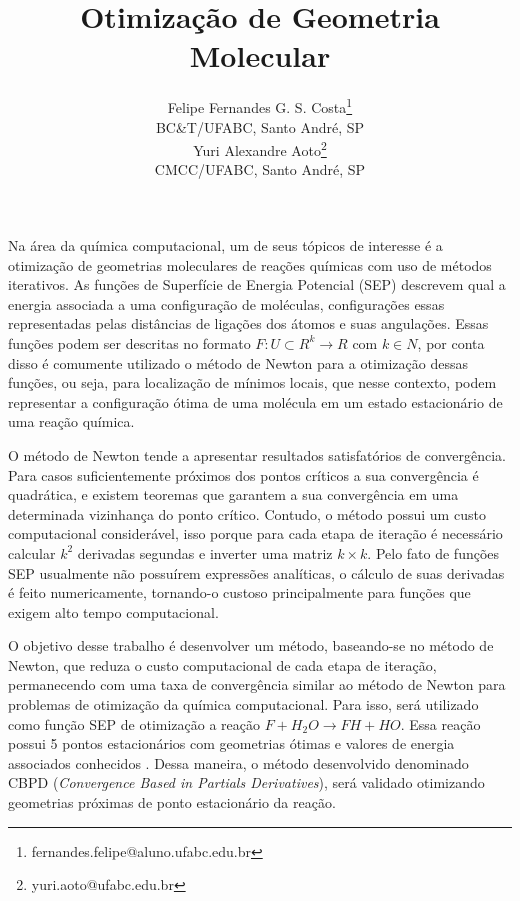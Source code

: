 \documentclass{pssbmac}
\begin{document}

\title{Otimização de Geometria Molecular}

\author{
    {\large Felipe Fernandes G. S. Costa}\thanks{fernandes.felipe@aluno.ufabc.edu.br} \\
    {\small BC\&T/UFABC, Santo André, SP} \\
    {\large Yuri Alexandre Aoto}\thanks{yuri.aoto@ufabc.edu.br} \\
    {\small CMCC/UFABC, Santo André, SP} \\
}
\criartitulo



Na área da química computacional, um de seus tópicos de interesse é a otimização de geometrias moleculares de reações químicas com uso de métodos iterativos. As funções de Superfície de Energia Potencial (SEP) descrevem qual a energia associada a uma configuração de moléculas, configurações essas representadas pelas distâncias de ligações dos átomos e suas angulações. Essas funções podem ser descritas no formato $F: U \subset R^k\to R$ com $k \in N$, por conta disso é comumente utilizado o método de Newton para a otimização dessas funções, ou seja, para localização de mínimos locais, que nesse contexto, podem representar a configuração ótima de uma molécula em um estado estacionário de uma reação química.

O método de Newton tende a apresentar resultados satisfatórios de convergência. Para casos suficientemente próximos dos pontos críticos a sua convergência é quadrática, e existem teoremas \cite{calculo_numerico_aplicado} que garantem a sua convergência em uma determinada vizinhança do ponto crítico. Contudo, o método possui um custo computacional considerável, isso porque para cada etapa de iteração é necessário calcular $k^2$ derivadas segundas e inverter uma matriz $k \times k$. Pelo fato de funções SEP usualmente não possuírem expressões analíticas, o cálculo de suas derivadas é feito numericamente, tornando-o custoso principalmente para funções que exigem alto tempo computacional.

O objetivo desse trabalho é desenvolver um método, baseando-se no método de Newton, que reduza o custo computacional de cada etapa de iteração, permanecendo com uma taxa de convergência similar ao método de Newton para problemas de otimização da química computacional. Para isso, será utilizado como função SEP \cite{fh2o_sep_fortran_module} de otimização a reação $F + H_2O \to FH + HO$. Essa reação possui 5 pontos estacionários com geometrias ótimas e valores de energia associados conhecidos \cite{fh2o_first_sep}. Dessa maneira, o método desenvolvido denominado CBPD (\textit{Convergence Based in Partials Derivatives}), será validado otimizando geometrias próximas de ponto estacionário da reação.
\end{document}
